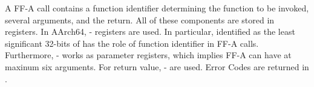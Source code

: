 \documentclass[a4paper]{article}
\newcommand*{\sem}[1]{\llbracket {#1} \rrbracket}
\newcommand*{\DN}[1]{\mathtt{Done} \; {#1}}
\newcommand*{\NXT}[1]{\mathtt{Next} \; {#1}}
\begin{document}

A FF-A call contains a function identifier determining the function to be
invoked, several arguments, and the return. All of these components are stored
in registers. In AArch64, - registers are used. In particular,
 identified as the least significant 32-bits of  has the role of
function identifier in FF-A calls. Furthermore, - works as
parameter registers, which implies FF-A can have at maxinum six arguments. For
return value, - are used. Error Codes are returned in .


\newcommand{\sema}[1]{\sem{ {#1} }(\Delta,m,s,v)}
\newcommand{\llen}[1]{\text{len}( {#1})}
\newcommand{\leftshift}{\!\!\!\!}
\newcommand{\DNXT}[2]{(\DN{\NXT{ {#1} }}, {#2})}
\newcommand{\nextt}{\text{tick}}
\newcommand{\toword}[1]{\text{{#1}}}
\end{document}
